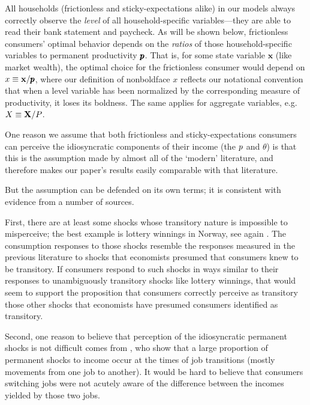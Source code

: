 \documentclass[titlepage]{./econtex}
\begin{document}
All households (frictionless and sticky-expectations alike) in our models always correctly observe the \textit{level} of all household-specific variables---they are able to read their bank statement and paycheck. As will be shown below, frictionless consumers' optimal behavior depends on the {\it ratios} of those household-specific variables to permanent productivity $\pmb{p}$.  That is, for some state variable $\textbf{x}$ (like market wealth), the optimal choice for the frictionless consumer would depend on ${x} \equiv \mathbf{x}/{\pmb{p}}$, where our definition of nonboldface ${x}$ reflects our notational convention that when a level variable has been normalized by the corresponding measure of productivity, it loses its boldness.  The same applies for aggregate variables, e.g.\ ${X} \equiv \mathbf{X}/{P}$.

\hypertarget{Why-Consumers-See-Individual-Shocks}{}

One reason we assume that both frictionless and sticky-expectations consumers can perceive the idiosyncratic components of their income (the $p$ and $\theta$) is that this is the assumption made by almost all of the `modern' literature, and therefore makes our paper's results easily comparable with that literature.

But the assumption can be defended on its own terms; it is consistent with evidence from a number of sources.

First, there are at least some shocks whose transitory nature is impossible to misperceive; the best example is lottery winnings in Norway, see again \cite{fhnMPC}.  The consumption responses to those shocks resemble the responses measured in the previous literature to shocks that economists presumed that consumers knew to be transitory.  If consumers respond to such shocks in ways similar to their responses to unambiguously transitory shocks like lottery winnings, that would seem to support the proposition that consumers correctly perceive as transitory those other shocks that economists have presumed consumers identified as transitory.

Second, one reason to believe that perception of the idiosyncratic permanent shocks is not difficult comes from \cite{lmpPermShocks}, who show that a large proportion of permanent shocks to income occur at the times of job transitions (mostly movements from one job to another).  It would be hard to believe that consumers switching jobs were not acutely aware of the difference between the incomes yielded by those two jobs.
\end{document}
